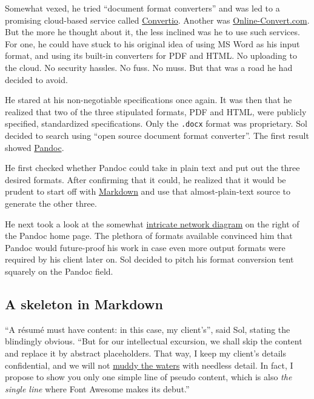 \documentclass[
  british,
  a4paper,
  rgb,
  dvipsnames,
  svgnames,
  hyphens]{article}
\begin{document}
Somewhat vexed, he tried ``document format converters'' and was led to a
promising cloud-based service called
\href{https://convertio.co/document-converter/}{Convertio}. Another was
\href{https://document.online-convert.com/}{Online-Convert.com}. But the
more he thought about it, the less inclined was he to use such services.
For one, he could have stuck to his original idea of using MS Word as
his input format, and using its built-in converters for PDF and HTML. No
uploading to the cloud. No security hassles. No fuss. No muss. But that
was a road he had decided to avoid.

He stared at his non-negotiable specifications once again. It was then
that he realized that two of the three stipulated formats, PDF and HTML,
were publicly specified, standardized specifications. Only the
\texttt{.docx} format was proprietary. Sol decided to search using
``open source document format converter''. The first result showed
\href{https://pandoc.org/}{Pandoc}.

He first checked whether Pandoc could take in plain text and put out the
three desired formats. After confirming that it could, he realized that
it would be prudent to start off with
\href{https://daringfireball.net/projects/markdown/}{Markdown} and use
that almost-plain-text source to generate the other three.

He next took a look at the somewhat
\href{https://pandoc.org/diagram.svg}{intricate network diagram} on the
right of the Pandoc home page. The plethora of formats available
convinced him that Pandoc would future-proof his work in case even more
output formats were required by his client later on. Sol decided to
pitch his format conversion tent squarely on the Pandoc field.

\hypertarget{a-skeleton-in-markdown}{%
\subsection{A skeleton in Markdown}\label{a-skeleton-in-markdown}}

``A résumé must have content: in this case, my client's'', said Sol,
stating the blindingly obvious. ``But for our intellectual excursion, we
shall skip the content and replace it by abstract placeholders. That
way, I keep my client's details confidential, and we will not
\href{https://idioms.thefreedictionary.com/muddy+the+waters}{muddy the
waters} with needless detail. In fact, I propose to show you only one
simple line of pseudo content, which is also \emph{the single line}
where Font Awesome makes its debut.''
\end{document}
